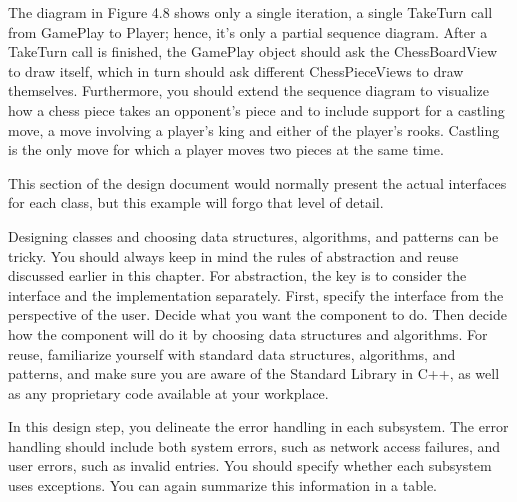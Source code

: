 The diagram in Figure 4.8 shows only a single iteration, a single TakeTurn call from GamePlay to Player; hence, it’s only a partial sequence diagram. After a TakeTurn call is finished, the GamePlay object should ask the ChessBoardView to draw itself, which in turn should ask different ChessPieceViews to draw themselves. Furthermore, you should extend the sequence diagram to visualize how a chess piece takes an opponent’s piece and to include support for a castling move, a move involving a player’s king and either of the player’s rooks. Castling is the only move for which a player moves two pieces at the same time.

This section of the design document would normally present the actual interfaces for each class, but this example will forgo that level of detail.

Designing classes and choosing data structures, algorithms, and patterns can be tricky. You should always keep in mind the rules of abstraction and reuse discussed earlier in this chapter. For abstraction, the key is to consider the interface and the implementation separately. First, specify the interface from the perspective of the user. Decide what you want the component to do. Then decide how the component will do it by choosing data structures and algorithms. For reuse, familiarize yourself with standard data structures, algorithms, and patterns, and make sure you are aware of the Standard Library in C++, as well as any proprietary code available at your workplace.


In this design step, you delineate the error handling in each subsystem. The error handling should include both system errors, such as network access failures, and user errors, such as invalid entries. You should specify whether each subsystem uses exceptions. You can again summarize this information in a table.

